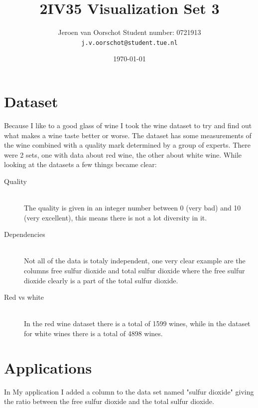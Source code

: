 \documentclass[a4paper,twoside,11pt]{article}
\title{\vspace{-\baselineskip}\sffamily\bfseries 2IV35 Visualization Set 3}
\author{Jeroen van Oorschot \qquad Student number: 0721913 \\{\tt j.v.oorschot@student.tue.nl}}
\date{\today}
\begin{document}
\maketitle

\pagebreak
\tableofcontents
\newpage
\section{Dataset}
Because I like to a good glass of wine I took the wine dataset to try and find out what makes a wine taste better or worse. The dataset has some measurements of the wine combined with a quality mark determined by a group of experts. There were 2 sets, one with data about red wine, the other about white wine. While looking at the datasets a few things became clear:

\begin{description}
\item[Quality] \hfill \\ The quality is given in an integer number between 0 (very bad) and 10 (very excellent), this means there is not a lot diversity in it.
\item[Dependencies] \hfill \\ Not all of the data is totaly independent, one very clear example are the columns free sulfur dioxide and total sulfur dioxide where the free sulfur dioxide clearly is a part of the total sulfur dioxide.
\item[Red vs white] \hfill \\ In the red wine dataset there is a total of 1599 wines, while in the dataset for white wines there is a total of 4898 wines.
\end{description}

\section{Applications}
In My application I added a column to the data set named "sulfur dioxide" giving the ratio between  the free sulfur dioxide and the total sulfur dioxide. 
\end{document}
